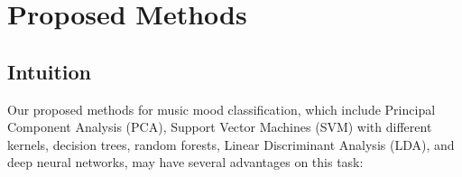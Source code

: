 \documentclass{article}
\begin{document}






\section{Proposed Methods}

\subsection{Intuition}
Our proposed methods for music mood classification, which include Principal Component Analysis (PCA), Support Vector Machines (SVM) with different kernels, decision trees, random forests, Linear Discriminant Analysis (LDA), and deep neural networks, may have several advantages on this task:
\end{document}
